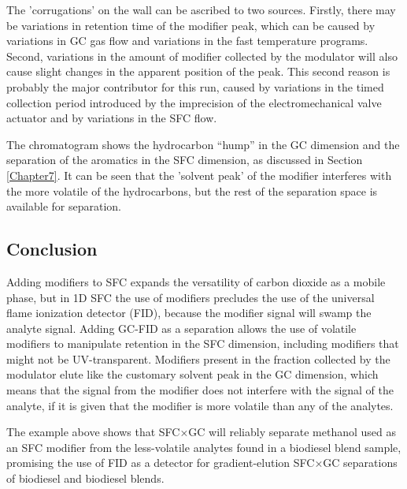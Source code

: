 The 'corrugations' on the wall can be ascribed to two sources. Firstly, there
may be variations in retention time of the modifier peak, which can be caused by
variations in GC gas flow and variations in the fast temperature programs.
Second, variations in the amount of modifier collected by the modulator will
also cause slight changes in the apparent position of the peak. This second
reason is probably the major contributor for this run, caused by variations in
the timed collection period introduced by the imprecision of the
electromechanical valve actuator and by variations in the SFC flow.

The chromatogram shows the hydrocarbon ``hump'' in the GC dimension and the
separation of the aromatics in the SFC dimension, as discussed in Section
\ref{Chapter7}. It can be seen that the 'solvent peak' of the modifier
interferes with the more volatile of the hydrocarbons, but the rest of the
separation space is available for separation.

\subsection{Conclusion}

Adding modifiers to SFC expands the versatility of carbon dioxide as a mobile
phase, but in 1D SFC the use of modifiers precludes the use of the universal
flame ionization detector (FID), because the modifier signal will swamp the
analyte signal. Adding GC-FID as a \twoD separation allows the use of volatile
modifiers to manipulate retention in the SFC dimension, including modifiers that
might not be UV-transparent. Modifiers present in the fraction collected by the
modulator elute like the customary solvent peak in the GC dimension, which means
that the signal from the modifier does not interfere with the signal of the
analyte, if it is given that the modifier is more volatile than any of the
analytes.
 
The example above shows that SFC×GC will reliably separate methanol used as an
SFC modifier from the less-volatile analytes found in a biodiesel blend sample,
promising the use of FID as a detector for gradient-elution SFC×GC separations
of biodiesel and biodiesel blends.
